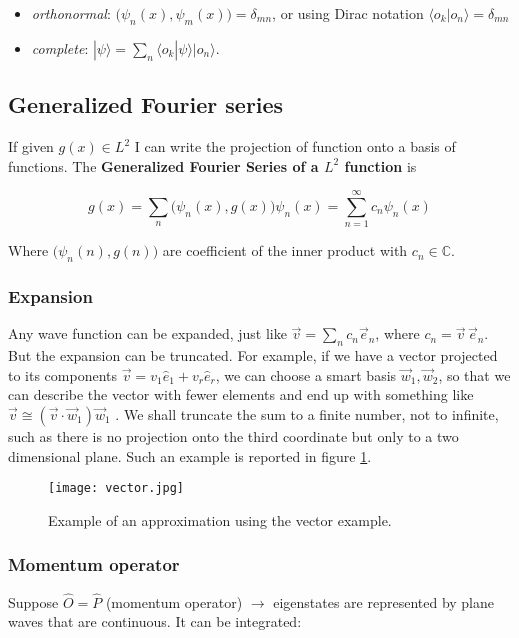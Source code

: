 	\begin{multicols}{2}
		\begin{itemize}
		\item \textit{orthonormal}: $\bigl(\psi_n(x),\psi_m(x)\bigr)=\delta_{mn}$, or using Dirac notation $\langle o_k|o_n \rangle = \delta_{mn}$
		\item \textit{complete}: $ | \psi \rangle = \sum_n \langle o_k | \psi \rangle |o_n \rangle$.
		\end{itemize}
	\end{multicols}

	\subsection{Generalized Fourier series}
	If given $g(x)\in L^2$ I can write the projection of function onto a basis of functions.
	The \textbf{Generalized Fourier Series of a $L^2$ function} is

	$$g(x)=\sum_{n}\bigl(\psi_n(x),g(x)\bigr)\psi_n(x) =\sum_{n=1}^{\infty}c_n\psi_n(x)$$

	Where $\bigl(\psi_n(n),g(n)\bigr)$ are coefficient of the inner product with $c_n\in \mathbb{C}$.

		\subsubsection{Expansion}

		Any wave function can be expanded, just like $\vec{v} = \sum_n c_n \vec{e}_n$, where $c_n = \vec{v} \, \vec{e}_n$.
		But the expansion can be truncated.
		For example, if we have a vector projected to its components $\vec v = v_1\hat{e}_1+v_r\hat{e}_r$, we can choose a smart basis ${\vec{w}_1, \vec{w}_2}$, so that we can describe the vector with fewer elements and end up with something like $ \vec{v} \cong (\vec{v} \cdot \vec{w}_1) \vec{w}_1 $ .
		We shall truncate the sum to a finite number, not to infinite, such as there is no projection onto the third coordinate but only to a two dimensional plane. Such an example is reported in figure \ref{fig:vector}.
	\begin{figure}[htbp!]
    \centering
    \texttt{[image: vector.jpg]}
    \caption{Example of an approximation using the vector example.}
    \label{fig:vector}
\end{figure}
		\subsubsection{Momentum operator}
		Suppose $\hat{O}=\hat{P}$ (momentum operator) $\rightarrow$ eigenstates are represented by plane waves that are continuous.
		It can be integrated:

